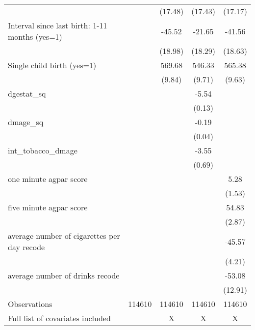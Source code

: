 {\begin{tabular}{l*{4}{c}}
                                                  &            &     (17.48)&     (17.43)&     (17.17)\\
Interval since last birth: 1-11 months (yes=1)    &            &      -45.52&      -21.65&      -41.56\\
                                                  &            &     (18.98)&     (18.29)&     (18.63)\\
Single child birth (yes=1)                        &            &      569.68&      546.33&      565.38\\
                                                  &            &      (9.84)&      (9.71)&      (9.63)\\
dgestat\_sq                                        &            &            &       -5.54&            \\
                                                  &            &            &      (0.13)&            \\
dmage\_sq                                          &            &            &       -0.19&            \\
                                                  &            &            &      (0.04)&            \\
int\_tobacco\_dmage                                 &            &            &       -3.55&            \\
                                                  &            &            &      (0.69)&            \\
one minute agpar score                            &            &            &            &        5.28\\
                                                  &            &            &            &      (1.53)\\
five minute agpar score                           &            &            &            &       54.83\\
                                                  &            &            &            &      (2.87)\\
average number of cigarettes per day recode       &            &            &            &      -45.57\\
                                                  &            &            &            &      (4.21)\\
average number of drinks recode                   &            &            &            &      -53.08\\
                                                  &            &            &            &     (12.91)\\
\hline
Observations                                      &      114610&      114610&      114610&      114610\\
Full list of covariates included                  &            &           X&           X&           X\\
\hline\hline
\end{tabular}
}
